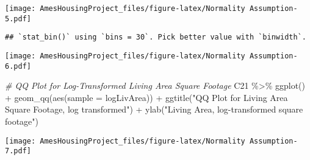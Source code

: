 \documentclass[
]{article}
\newenvironment{Shaded}{\begin{snugshade}}{\end{snugshade}}
\newcommand{\AttributeTok}[1]{\textcolor[rgb]{0.77,0.63,0.00}{#1}}
\newcommand{\CommentTok}[1]{\textcolor[rgb]{0.56,0.35,0.01}{\textit{#1}}}
\newcommand{\FunctionTok}[1]{\textcolor[rgb]{0.00,0.00,0.00}{#1}}
\newcommand{\NormalTok}[1]{#1}
\newcommand{\OtherTok}[1]{\textcolor[rgb]{0.56,0.35,0.01}{#1}}
\newcommand{\SpecialCharTok}[1]{\textcolor[rgb]{0.00,0.00,0.00}{#1}}
\newcommand{\StringTok}[1]{\textcolor[rgb]{0.31,0.60,0.02}{#1}}
\begin{document}
\texttt{[image: AmesHousingProject\_files/figure-latex/Normality Assumption-5.pdf]}

\begin{Shaded}
\end{Shaded}

\begin{verbatim}
## `stat_bin()` using `bins = 30`. Pick better value with `binwidth`.
\end{verbatim}

\texttt{[image: AmesHousingProject\_files/figure-latex/Normality Assumption-6.pdf]}

\begin{Shaded}
\begin{Highlighting}[]
\CommentTok{\# QQ Plot for Log{-}Transformed Living Area Square Footage}
\NormalTok{C21 }\SpecialCharTok{\%\textgreater{}\%} \FunctionTok{ggplot}\NormalTok{() }\SpecialCharTok{+} \FunctionTok{geom\_qq}\NormalTok{(}\FunctionTok{aes}\NormalTok{(}\AttributeTok{sample =}\NormalTok{ logLivArea)) }\SpecialCharTok{+} 
  \FunctionTok{ggtitle}\NormalTok{(}\StringTok{"QQ Plot for Living Area Square Footage, log transformed"}\NormalTok{) }\SpecialCharTok{+} 
  \FunctionTok{ylab}\NormalTok{(}\StringTok{"Living Area, log{-}transformed square footage"}\NormalTok{)}
\end{Highlighting}
\end{Shaded}

\texttt{[image: AmesHousingProject\_files/figure-latex/Normality Assumption-7.pdf]}

\begin{Shaded}
\end{Shaded}
\end{document}
